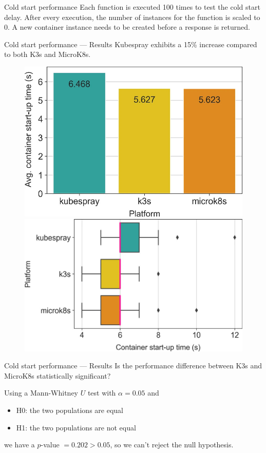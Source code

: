 \begin{frame}{Cold start performance}
Each function is executed 100 times to test the cold start delay. \pause
After every execution, the number of instances for the function is scaled to 0. A new container instance needs to be created before a response is returned.
\end{frame}

\begin{frame}{Cold start performance — Results}
Kubespray exhibits a 15\% increase compared to both K3s and MicroK8s.

\begin{figure}
    \includegraphics[width=0.5\linewidth]{static/11227_2022_4430_Fig1_HTML.jpg}\hfill
    \includegraphics[width=0.5\linewidth]{static/11227_2022_4430_Fig2_HTML.jpg}
\end{figure}

\end{frame}

\begin{frame}{Cold start performance — Results}
Is the performance difference between K3s and MicroK8s statistically significant?
\pause

Using a Mann-Whitney \(U\) test with \(\alpha = 0.05\) and 
\begin{itemize}
    \item H0: the two populations are equal
    \item H1: the two populations are not equal
\end{itemize}

we have a \(p\)-value \(= 0.202 > 0.05\), so we can't reject the null hypothesis.

\end{frame}

